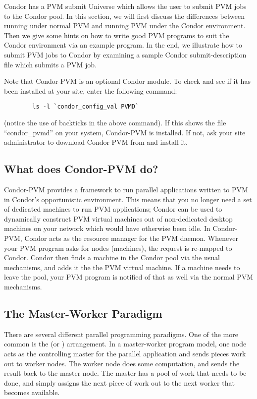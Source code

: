 
\newcommand{\func}[1]{\texttt{#1}}

Condor has a PVM submit Universe which allows the user to submit PVM jobs to
the Condor pool.  In this section, we will first
discuss the differences between running under normal PVM and running PVM under the Condor
environment.  Then we give some hints on how to write good PVM
programs to suit the Condor environment via an example program.  In the
end, we illustrate how to submit PVM jobs to Condor by examining a
sample Condor submit-description file which submits a PVM job.

Note that Condor-PVM is an optional Condor module.  To check and see if
it has been installed at your site, enter the following command:
\begin{verbatim}
        ls -l `condor_config_val PVMD`
\end{verbatim}
(notice the use of backticks in the above command).  If this shows the
file ``condor\_pvmd'' on your system, Condor-PVM is installed.  If not,
ask your site administrator to download Condor-PVM from
 and install it.

\subsection{What does Condor-PVM do?}

Condor-PVM provides a framework to run parallel applications written to
PVM in Condor's opportunistic environment.  This means that you no
longer need a
set of dedicated machines to run PVM applications; Condor can be used to dynamically 
construct PVM virtual machines out of non-dedicated desktop machines on your network
which would have otherwise been idle.   In Condor-PVM, Condor acts as the
resource manager for the PVM daemon.  Whenever your PVM program asks
for nodes (machines), the request is re-mapped to Condor.  Condor then
finds a machine in the Condor pool via the usual mechanisms, and adds it
the the PVM virtual machine.  If a machine needs to leave the pool, your
PVM program is notified of that as well via the normal PVM mechanisms.

\subsection{The Master-Worker Paradigm}

There are several different parallel programming paradigms.  One of the
more common is the  (or )
arrangement.  In a master-worker program model, one node acts as the
controlling master for the parallel application and sends pieces work out to worker nodes.  The
worker node does some computation, and sends the result back to the
master node.  The master has a pool of work that needs to be
done, and simply assigns the next piece of work out to the next worker
that becomes available.  

